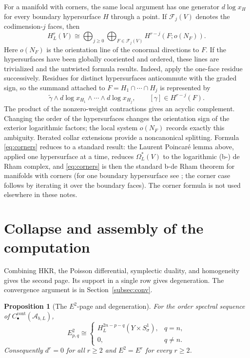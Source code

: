 \documentclass[11pt,oneside,reqno]{article}
\newcommand{\cA}{\mathcal A}
\theoremstyle{plain}
\newtheorem{proposition}[theorem]{Proposition}
\theoremstyle{definition}
\theoremstyle{remark}
\begin{document}
For a manifold with corners, the same local argument has one generator
\(d\log x_H\) for every boundary hypersurface \(H\) through a point. If
\(\mathcal F_j(V)\) denotes the codimension-\(j\) faces, then
\begin{equation}\label{eq:corners}
 H_L^r(V)
 \cong\bigoplus_{j\geq0}
       \bigoplus_{F\in\mathcal F_j(V)}
       H^{r-j}(F;o(N_F)).
\end{equation}
Here \(o(N_F)\) is the orientation line of the conormal directions to
\(F\). If the hypersurfaces have been globally cooriented and ordered,
these lines are trivialized and the untwisted formula results.
Indeed, apply the one-face residue successively. Residues for distinct
hypersurfaces anticommute with the graded sign, so the summand attached to
\(F=H_1\cap\cdots\cap H_j\) is represented by
\[
 \widetilde\gamma\wedge d\log x_{H_1}\wedge\cdots\wedge d\log x_{H_j},
 \qquad [\gamma]\in H^{r-j}(F).
\]
The product of the nonzero-weight contractions gives an acyclic complement.
Changing the order of the hypersurfaces changes the orientation sign of
the exterior logarithmic factors; the local system \(o(N_F)\) records
exactly this ambiguity. Iterated collar extensions provide a noncanonical
splitting. Formula \eqref{eq:corners} reduces to a standard result: the Laurent
Poincar\'e lemma above, applied one hypersurface at a time, reduces
\(\Omega_L^*(V)\) to the logarithmic (b-) de Rham complex, and
\eqref{eq:corners} is then the standard b-de Rham theorem for manifolds
with corners (for one boundary hypersurface see \cite{MelroseAPS}; the
corner case follows by iterating it over the boundary faces). The corner
formula is not used elsewhere in these notes.

\section{Collapse and assembly of the computation}\label{sec:collapse}

Combining HKR, the Poisson differential, symplectic duality, and homogeneity
gives the second page. Its support in a single row gives degeneration.
The convergence argument is in Section~\ref{subsec:conv}.

\begin{proposition}[The \(E^2\)-page and degeneration]\label{prop:E2}
For the order spectral sequence of
\(C_\bullet^{\mathrm{cont}}(\cA_{b,L})\),
\[
 E^2_{p,q}\cong
 \begin{cases}
 H_L^{2n-p-q}(Y\times S^1_\sigma), & q=n,\\
 0, & q\neq n.
 \end{cases}
\]
Consequently \(d^r=0\) for all \(r\geq2\) and \(E^2=E^r\) for every
\(r\geq2\).
\end{proposition}
\end{document}
